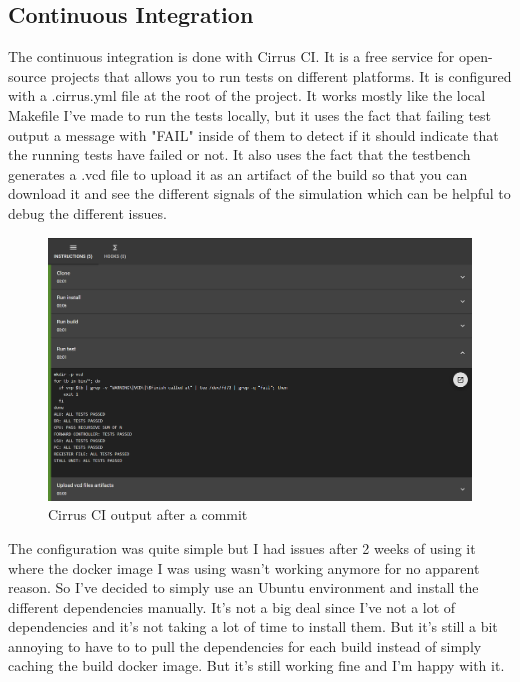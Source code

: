 \subsection{Continuous Integration}

The continuous integration is done with Cirrus CI. It is a free service for open-source projects that allows you to run tests on different
platforms. It is configured with a .cirrus.yml file at the root of the project. It works mostly like the local Makefile I've made to run 
the tests locally, but it uses the fact that failing test output a message with "FAIL" inside of them to detect if it should indicate that 
the running tests have failed or not. It also uses the fact that the testbench generates a .vcd file to upload it as an artifact of the build
so that you can download it and see the different signals of the simulation which can be helpful to debug the different issues.

\begin{figure}[H]
    \centering
    \includegraphics[width=1\textwidth]{testing/images/ci.png}
    \caption{Cirrus CI output after a commit}
    \label{fig:ci}
\end{figure}

The configuration was quite simple but I had issues after 2 weeks of using it where the docker image I was using wasn't working anymore for 
no apparent reason. So I've decided to simply use an Ubuntu environment and install the different dependencies manually. It's not a big 
deal since I've not a lot of dependencies and it's not taking a lot of time to install them. But it's still a bit annoying to have to
to pull the dependencies for each build instead of simply caching the build docker image. But it's still working fine and I'm happy with it.